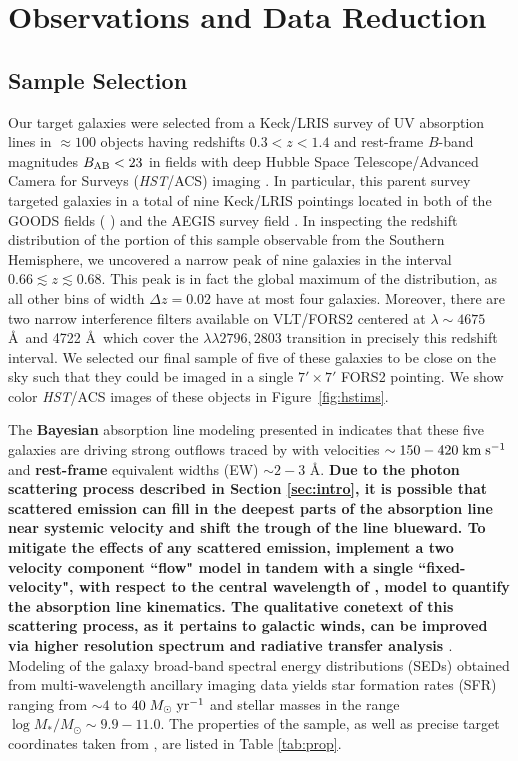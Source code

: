 \documentclass[twocolumn]{aastex62}
\def \mkms {{\rm \; km\;s^{-1}}}
\def \msunperyr {{\; M_{\odot}\rm \;yr^{-1}}}
\begin{document}
\section{Observations and Data Reduction}\label{sec:obs_red}
\subsection{Sample Selection}
Our target galaxies were selected from a Keck/LRIS survey of UV absorption lines in $\approx 100$ objects having redshifts $0.3< z < 1.4$ and rest-frame $B$-band magnitudes $B_{\rm AB}< 23$ in fields with deep Hubble Space Telescope/Advanced Camera for Surveys (\emph{HST}/ACS) imaging \citep{Rubin_2014}.  In particular, this parent survey targeted galaxies in a total of nine Keck/LRIS pointings located in both of the GOODS fields (\citeauthor{Giavalisco2004} \citeyear{Giavalisco2004}) and the AEGIS survey field \citep[the Extended Groth Strip;][]{Davis2007}.  In inspecting the redshift distribution of the portion of this sample observable from the Southern Hemisphere, we uncovered a narrow peak of nine galaxies in the interval $0.66 \lesssim z \lesssim 0.68$.  This peak is in fact the global maximum of the distribution, as all other bins of width $\Delta z = 0.02$ have at most four galaxies.  Moreover, there are two narrow interference filters available on VLT/FORS2 centered at $\lambda \sim 4675$ \AA\ and 4722 \AA\ which cover the  $\lambda \lambda 2796, 2803$ transition in precisely this redshift interval.  We selected our final sample of five of these galaxies %
to be close on the sky such that they could be imaged in a single $7' \times 7' $ FORS2 pointing.  
We show color {\it HST}/ACS images of these objects in Figure~\ref{fig:hstims}.

The \textbf{Bayesian} absorption line modeling presented in \cite{Rubin_2014} indicates that these five galaxies are driving strong outflows traced by   with velocities $\sim150-420\mkms$ and \textbf{rest-frame} equivalent widths (EW) $\sim 2-3$ \AA. \textbf{Due to the photon scattering process described in Section \ref{sec:intro}, it is possible that scattered emission can fill in the deepest parts of the absorption line near systemic velocity and shift the trough of the line blueward. To mitigate the effects of any scattered emission, \cite{Rubin_2014} implement a two velocity component ``flow" model in tandem with a single ``fixed-velocity", with respect to the central wavelength of , model to quantify the absorption line kinematics. The qualitative conetext of this scattering process, as it pertains to galactic winds, can be improved via higher resolution spectrum and radiative transfer analysis \cite{Prochaska_2011}}. Modeling of the galaxy broad-band spectral energy distributions (SEDs) obtained from multi-wavelength ancillary imaging data yields star formation rates (SFR) ranging from $\sim4$ to $40\msunperyr$ and stellar masses in the range $\log M_*/M_{\odot}\sim 9.9-11.0$. The properties of the sample, as well as precise target coordinates taken from \cite{Rubin_2014}, are listed in Table \ref{tab:prop}. 
\end{document}

